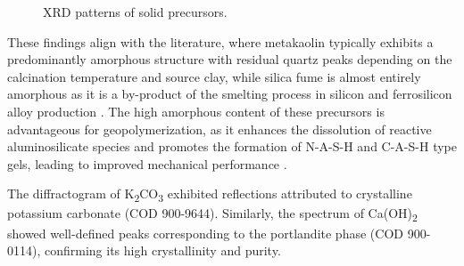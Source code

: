 \begin{figure}[H]
    \centering
    \caption{XRD patterns of solid precursors.}
    \label{fig:xrd_precursors}
\end{figure}

These findings align with the literature, where metakaolin typically exhibits a predominantly amorphous structure with residual quartz peaks depending on the calcination temperature and source clay, while silica fume is almost entirely amorphous as it is a by-product of the smelting process in silicon and ferrosilicon alloy production \cite{pachecotorgal2014handbook}.
The high amorphous content of these precursors is advantageous for geopolymerization, as it enhances the dissolution of reactive aluminosilicate species and promotes the formation of N-A-S-H and C-A-S-H type gels, leading to improved mechanical performance \cite{qin2022onepart}.

The diffractogram of K\textsubscript{2}CO\textsubscript{3} exhibited reflections attributed to crystalline potassium carbonate (COD 900-9644).
Similarly, the spectrum of Ca(OH)\textsubscript{2} showed well-defined peaks corresponding to the portlandite phase (COD 900-0114), confirming its high crystallinity and purity.

